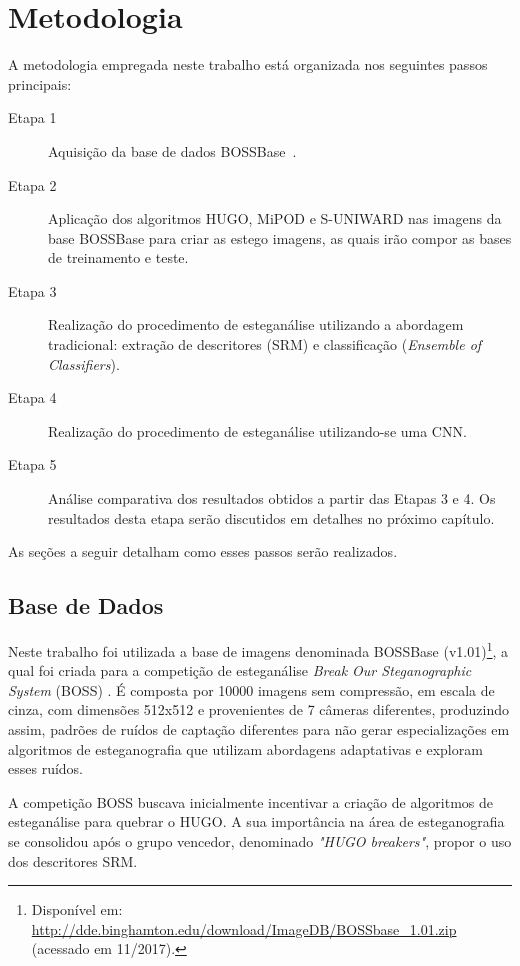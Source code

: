
\chapter{Metodologia}
\label{chap:metodologia}

A metodologia empregada neste trabalho está organizada nos seguintes passos principais:

\begin{description}
\item[Etapa 1] Aquisição da base de dados BOSSBase~\cite{bas2011break}.
\item[Etapa 2] Aplicação dos algoritmos HUGO, MiPOD e S-UNIWARD nas imagens da base BOSSBase para criar as estego imagens, as quais irão compor as bases de treinamento e teste.
\item[Etapa 3] Realização do procedimento de esteganálise utilizando a abordagem tradicional: extração de descritores (SRM) e classificação (\textit{Ensemble of Classifiers}).
\item[Etapa 4] Realização do procedimento de esteganálise utilizando-se uma CNN.
\item[Etapa 5] Análise comparativa dos resultados obtidos a partir das Etapas 3 e 4. Os resultados desta etapa serão discutidos em detalhes no próximo capítulo.
\end{description}

As seções a seguir detalham como esses passos serão realizados.

\section{Base de Dados}
\label{sec:database}

Neste trabalho foi utilizada a base de imagens denominada BOSSBase (v1.01)\footnote{Disponível em: \url{http://dde.binghamton.edu/download/ImageDB/BOSSbase_1.01.zip} (acessado em 11/2017).}, a qual  foi criada para a competição de esteganálise \textit{Break Our Steganographic System} (BOSS) \cite{bas2011break}. É composta por 10000 imagens sem compressão, em escala de cinza, com dimensões 512x512 e provenientes de 7 câmeras diferentes, produzindo assim, padrões de ruídos de captação diferentes para não gerar especializações em algoritmos de esteganografia que utilizam abordagens adaptativas e exploram esses ruídos.

A competição BOSS buscava inicialmente incentivar a criação de algoritmos de esteganálise para quebrar o HUGO. A sua importância na área de esteganografia se consolidou após o grupo vencedor, denominado \textit{"HUGO breakers"}, propor o uso dos descritores SRM.

